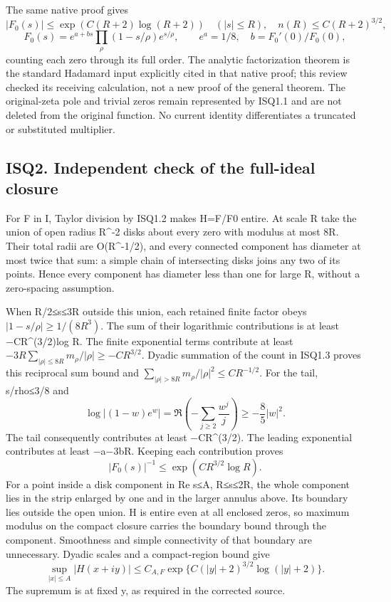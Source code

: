 \documentclass[
]{article}
\begin{document}
The same native proof gives \[
|F_0(s)|\le \exp(C(R+2)\log(R+2))\quad(|s|\le R),
\quad n(R)\le C(R+2)^{3/2},
\] \[
F_0(s)=e^{a+bs}\prod_\rho(1-s/\rho)e^{s/\rho},
\qquad e^a=1/8,\quad b=F_0'(0)/F_0(0),
\tag{ISQ1.3}
\] counting each zero through its full order. The analytic factorization theorem is the standard Hadamard input explicitly cited in that native proof; this review checked its receiving calculation, not a new proof of the general theorem. The original-zeta pole and trivial zeros remain represented by ISQ1.1 and are not deleted from the original function. No current identity differentiates a truncated or substituted multiplier.

\subsection{ISQ2. Independent check of the full-ideal closure}\label{isq2.-independent-check-of-the-full-ideal-closure}

For F in I, Taylor division by ISQ1.2 makes H=F/F0 entire. At scale R take the union of open radius R\^{}-2 disks about every zero with modulus at most 8R. Their total radii are O(R\^{}-1/2), and every connected component has diameter at most twice that sum: a simple chain of intersecting disks joins any two of its points. Hence every component has diameter less than one for large R, without a zero-spacing assumption.

When R/2≤\textbar s\textbar≤3R outside this union, each retained finite factor obeys \(|1-s/\rho|\ge1/(8R^3)\). The sum of their logarithmic contributions is at least −CR\^{}(3/2)log R. The finite exponential terms contribute at least \(-3R\sum_{|\rho|\le8R}m_\rho/|\rho|\ge-CR^{3/2}\). Dyadic summation of the count in ISQ1.3 proves this reciprocal sum bound and \(\sum_{|\rho|>8R}m_\rho/|\rho|^2\le CR^{-1/2}\). For the tail, \textbar s/rho\textbar≤3/8 and \[
\log|(1-w)e^w|=\Re\left(-\sum_{j\ge2}\frac{w^j}{j}\right)
\ge-\frac85|w|^2.
\] The tail consequently contributes at least −CR\^{}(3/2). The leading exponential contributes at least −\textbar a\textbar−3\textbar b\textbar R. Keeping each contribution proves \[
|F_0(s)|^{-1}\le\exp(CR^{3/2}\log R).
\tag{ISQ2.1}
\] For a point inside a disk component in \textbar Re s\textbar≤A, R≤\textbar s\textbar≤2R, the whole component lies in the strip enlarged by one and in the larger annulus above. Its boundary lies outside the open union. H is entire even at all enclosed zeros, so maximum modulus on the compact closure carries the boundary bound through the component. Smoothness and simple connectivity of that boundary are unnecessary. Dyadic scales and a compact-region bound give \[
\sup_{|x|\le A}|H(x+iy)|
\le C_{A,F}\exp\{C(|y|+2)^{3/2}\log(|y|+2)\}.
\tag{ISQ2.2}
\] The supremum is at fixed y, as required in the corrected source.
\end{document}
